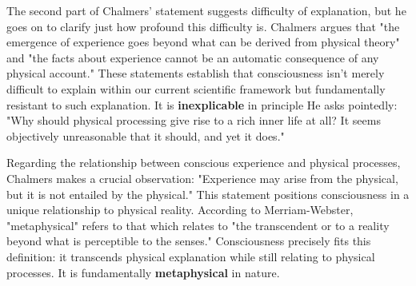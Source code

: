 \documentclass[runningheads]{llncs}
\begin{document}
The second part of Chalmers' statement suggests difficulty of explanation, but he goes on to clarify just how profound this difficulty is. Chalmers argues that "the emergence of experience goes beyond what can be derived from physical theory" and "the facts about experience cannot be an automatic consequence of any physical account." These statements establish that consciousness isn't merely difficult to explain within our current scientific framework but fundamentally resistant to such explanation. It is \textbf{inexplicable} in principle He asks pointedly: "Why should physical processing give rise to a rich inner life at all? It seems objectively unreasonable that it should, and yet it does."

Regarding the relationship between conscious experience and physical processes, Chalmers makes a crucial observation: "Experience may arise from the physical, but it is not entailed by the physical." This statement positions consciousness in a unique relationship to physical reality. According to Merriam-Webster, "metaphysical" refers to that which relates to "the transcendent or to a reality beyond what is perceptible to the senses." Consciousness precisely fits this definition: it transcends physical explanation while still relating to physical processes. It is fundamentally \textbf{metaphysical} in nature.
\end{document}
